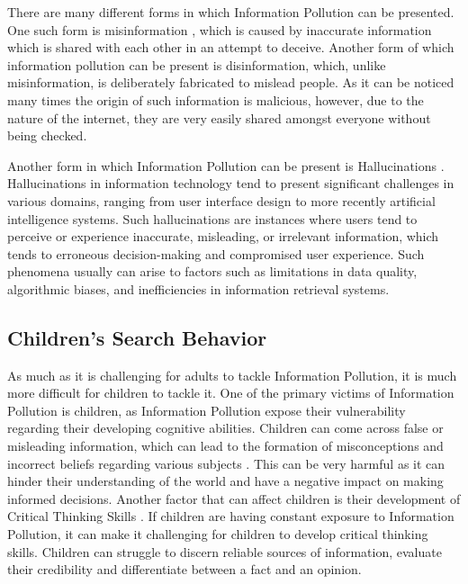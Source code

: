 \documentclass[50pt]{usiinfbachelorproject}
\begin{document}
There are many different forms in which Information Pollution can be presented. One such form is misinformation \cite{meel2020fake}, which is caused by inaccurate information which is shared with each other in an attempt to deceive. Another form of which information pollution can be present is disinformation, which, unlike misinformation, is deliberately fabricated to mislead people. As it can be noticed many times the origin of such information is malicious, however, due to the nature of the internet, they are very easily shared amongst everyone without being checked. 

Another form in which Information Pollution can be present is Hallucinations \cite{shuster_poff_chen_kiela_weston_2021}. Hallucinations in information technology tend to present significant challenges in various domains, ranging from user interface design to more recently artificial intelligence systems. Such hallucinations are instances where users tend to perceive or experience inaccurate, misleading, or irrelevant information, which tends to erroneous decision-making and compromised user experience. Such phenomena usually can arise to factors such as limitations in data quality, algorithmic biases, and inefficiencies in information retrieval systems.

\subsection{Children's Search Behavior}
As much as it is challenging for adults to tackle Information Pollution, it is much more difficult for children to tackle it. One of the primary victims of Information Pollution is children, as Information Pollution expose their vulnerability regarding their developing cognitive abilities. Children can come across false or misleading information, which can lead to the formation of misconceptions and incorrect beliefs regarding various subjects \cite{lovenheim2018does}. This can be very harmful as it can hinder their understanding of the world and have a negative impact on making informed decisions. Another factor that can affect children is their development of Critical Thinking Skills \cite{kalinina2018psychological}. If children are having constant exposure to Information Pollution, it can make it challenging for children to develop critical thinking skills. Children can struggle to discern reliable sources of information, evaluate their credibility and differentiate between a fact and an opinion. 
\end{document}
